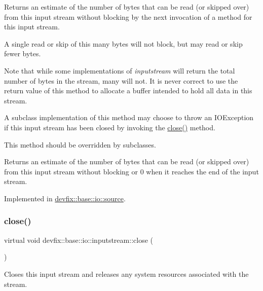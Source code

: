 Returns an estimate of the number of bytes that can be read (or skipped over) from this input stream without blocking by the next invocation of a method for this input stream. 

A single read or skip of this many bytes will not block, but may read or skip fewer bytes.

Note that while some implementations of {\itshape inputstream} will return the total number of bytes in the stream, many will not. It is never correct to use the return value of this method to allocate a buffer intended to hold all data in this stream.

A subclass\textquotesingle{} implementation of this method may choose to throw an I\+O\+Exception if this input stream has been closed by invoking the \hyperlink{structdevfix_1_1base_1_1io_1_1inputstream_a1188eff97757eb9625be91dfeca17af7}{close()} method.

This method should be overridden by subclasses.

\begin{DoxyReturn}{Returns}
an estimate of the number of bytes that can be read (or skipped over) from this input stream without blocking or 0 when it reaches the end of the input stream. 
\end{DoxyReturn}


Implemented in \hyperlink{structdevfix_1_1base_1_1io_1_1source_a911f4ba79499a623de30cf16d3d26d47}{devfix\+::base\+::io\+::source}.

\mbox{\label{structdevfix_1_1base_1_1io_1_1inputstream_a1188eff97757eb9625be91dfeca17af7}} 
\subsubsection{\texorpdfstring{close()}{close()}}
{\footnotesize\ttfamily virtual void devfix\+::base\+::io\+::inputstream\+::close (\begin{DoxyParamCaption}{ }\end{DoxyParamCaption})\hspace{0.3cm}{\ttfamily [pure virtual]}}



Closes this input stream and releases any system resources associated with the stream. 

